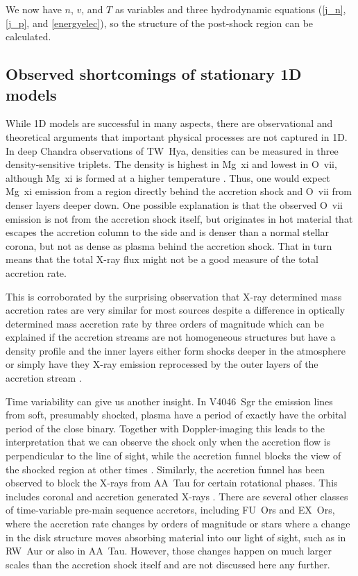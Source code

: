 We now have $n$, $v$, and $T$ as variables and three hydrodynamic equations (\ref{j_n}, \ref{j_p}, and \ref{energyelec}), so the structure of the post-shock region can be calculated.


\subsection{Observed shortcomings of stationary 1D models}
While 1D models are successful in many aspects, there are observational and theoretical arguments that important physical processes are not captured in 1D. In deep Chandra observations of TW~Hya, densities can be measured in three density-sensitive triplets. The density is highest in Mg~{\sc xi} and lowest in O~{\sc vii}, although Mg~{\sc xi} is formed at a higher temperature \cite{Brickhouse_2010}. Thus, one would expect Mg~{\sc xi} emission from a region directly behind the accretion shock and O~{\sc vii} from denser layers deeper down. One possible explanation is that the observed O~{\sc vii} emission is not from the accretion shock itself, but originates in hot material that escapes the accretion column to the side and is denser than a normal stellar corona, but not as dense as plasma behind the accretion shock. That in turn means that the total X-ray flux might not be a good measure of the total accretion rate.

This is corroborated by the surprising observation that X-ray determined mass accretion rates are very similar for most sources despite a difference in optically determined mass accretion rate by three orders of magnitude \cite{2011A&A...526A.104C} which can be explained if the accretion streams are not homogeneous structures but have a density profile and the inner layers either form shocks deeper in the atmosphere or simply have they X-ray emission reprocessed by the outer layers of the accretion stream \cite{2018A&A...618A..55S,2021Natur.597...41E}.

Time variability can give us another insight. In V4046~Sgr the emission lines from soft, presumably shocked, plasma have a period of exactly have the orbital period of the close binary. Together with Doppler-imaging this leads to the interpretation that we can observe the shock only when the accretion flow is perpendicular to the line of sight, while the accretion funnel blocks the view of the shocked region at other times \cite{2012ApJ...752..100A}. Similarly, the accretion funnel has been observed to block the X-rays from AA~Tau for certain rotational phases. This includes coronal and accretion generated X-rays \cite{2007A&A...462L..41S,2007A&A...475..607G}.
There are several other classes of time-variable pre-main sequence accretors, including FU~Ors and EX~Ors, where the accretion rate changes by orders of magnitude or stars where a change in the disk structure moves absorbing material into our light of sight, such as in RW~Aur or also in AA~Tau. However, those changes happen on much larger scales than the accretion shock itself and are not discussed here any further.

